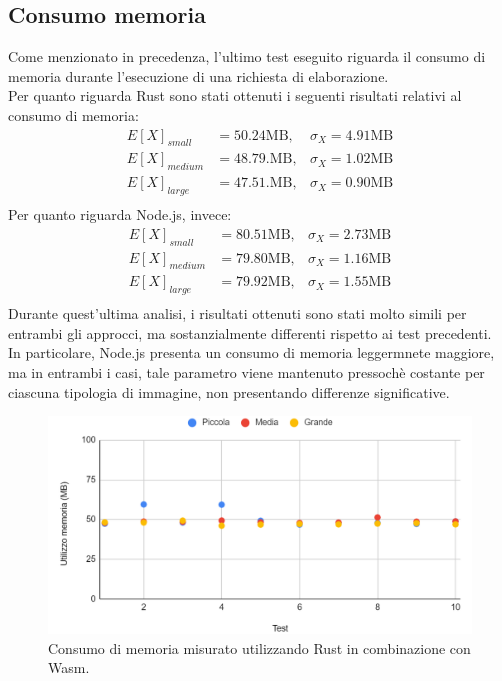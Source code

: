 \subsection{Consumo memoria}
Come menzionato in precedenza, l'ultimo test eseguito riguarda il consumo di memoria durante l'esecuzione di una richiesta di elaborazione. 
\\Per quanto riguarda Rust sono stati ottenuti i seguenti risultati relativi al consumo di memoria:
\begin{align*}
    E[X]_{small}&=50.24\text{MB},  & \sigma_X=4.91\text{MB}\\
    E[X]_{medium}&=48.79.\text{MB},  & \sigma_X=1.02\text{MB}\\
    E[X]_{large}&=47.51.\text{MB},  & \sigma_X=0.90\text{MB}\\
\end{align*}
Per quanto riguarda Node.js, invece:
\begin{align*}
    E[X]_{small}&=80.51\text{MB},  & \sigma_X=2.73\text{MB}\\
    E[X]_{medium}&=79.80\text{MB},  & \sigma_X=1.16\text{MB}\\
    E[X]_{large}&=79.92\text{MB},  & \sigma_X=1.55\text{MB}\\
\end{align*}
Durante quest'ultima analisi, i risultati ottenuti sono stati molto simili per entrambi gli approcci, ma sostanzialmente differenti rispetto ai test precedenti.
\\In particolare, Node.js presenta un consumo di memoria leggermnete maggiore, ma in entrambi i casi, tale parametro viene mantenuto pressochè costante per ciascuna tipologia di immagine, non presentando differenze significative.
\newpage
\begin{figure}
    \begin{center}
            \includegraphics[width=1\columnwidth]{images/rust_mem.png}
    \end{center}
    \caption{Consumo di memoria misurato utilizzando Rust in combinazione con Wasm.}
\end{figure}
